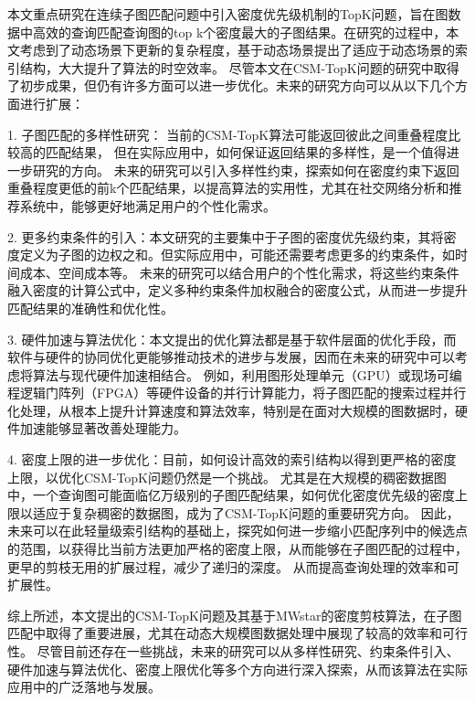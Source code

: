 \begin{summary}
	本文重点研究在连续子图匹配问题中引入密度优先级机制的TopK问题，旨在图数据中高效的查询匹配查询图的top k个密度最大的子图结果。在研究的过程中，本文考虑到了动态场景下更新的复杂程度，基于动态场景提出了适应于动态场景的索引结构，大大提升了算法的时空效率。
	尽管本文在CSM-TopK问题的研究中取得了初步成果，但仍有许多方面可以进一步优化。未来的研究方向可以从以下几个方面进行扩展：

		1.	子图匹配的多样性研究：
		当前的CSM-TopK算法可能返回彼此之间重叠程度比较高的匹配结果，
		但在实际应用中，如何保证返回结果的多样性，是一个值得进一步研究的方向。
		未来的研究可以引入多样性约束，探索如何在密度约束下返回重叠程度更低的前k个匹配结果，以提高算法的实用性，尤其在社交网络分析和推荐系统中，能够更好地满足用户的个性化需求。

		2.	更多约束条件的引入：本文研究的主要集中于子图的密度优先级约束，其将密度定义为子图的边权之和。但实际应用中，可能还需要考虑更多的约束条件，如时间成本、空间成本等。
		未来的研究可以结合用户的个性化需求，将这些约束条件融入密度的计算公式中，定义多种约束条件加权融合的密度公式，从而进一步提升匹配结果的准确性和优化性。


		3.	硬件加速与算法优化：本文提出的优化算法都是基于软件层面的优化手段，而软件与硬件的协同优化更能够推动技术的进步与发展，因而在未来的研究中可以考虑将算法与现代硬件加速相结合。
		例如，利用图形处理单元（GPU）或现场可编程逻辑门阵列（FPGA）等硬件设备的并行计算能力，将子图匹配的搜索过程并行化处理，从根本上提升计算速度和算法效率，特别是在面对大规模的图数据时，硬件加速能够显著改善处理能力。

		4.	密度上限的进一步优化：目前，如何设计高效的索引结构以得到更严格的密度上限，以优化CSM-TopK问题仍然是一个挑战。
		尤其是在大规模的稠密数据图中，一个查询图可能面临亿万级别的子图匹配结果，如何优化密度优先级的密度上限以适应于复杂稠密的数据图，成为了CSM-TopK问题的重要研究方向。
		因此，未来可以在此轻量级索引结构的基础上，探究如何进一步缩小匹配序列中的候选点的范围，以获得比当前方法更加严格的密度上限，从而能够在子图匹配的过程中，更早的剪枝无用的扩展过程，减少了递归的深度。
		从而提高查询处理的效率和可扩展性。

	综上所述，本文提出的CSM-TopK问题及其基于MWstar的密度剪枝算法，在子图匹配中取得了重要进展，尤其在动态大规模图数据处理中展现了较高的效率和可行性。
	尽管目前还存在一些挑战，未来的研究可以从多样性研究、约束条件引入、硬件加速与算法优化、密度上限优化等多个方向进行深入探索，从而该算法在实际应用中的广泛落地与发展。
\end{summary}
